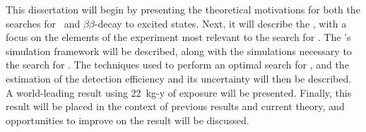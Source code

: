 {This dissertation will begin by presenting the theoretical motivations for both the searches for \znbb\ and $\beta\beta$-decay to excited states.
Next, it will describe the \MJD, with a focus on the elements of the experiment most relevant to the search for \bbes.
The \Demo 's simulation framework will be described, along with the simulations necessary to the search for \bbes.
The techniques used to perform an optimal search for \bbes, and the estimation of the detection efficiency and its uncertainty will then be described.
A world-leading result using 22~kg-y of exposure will be presented.
Finally, this result will be placed in the context of previous results and current theory, and opportunities to improve on the result will be discussed.
}
